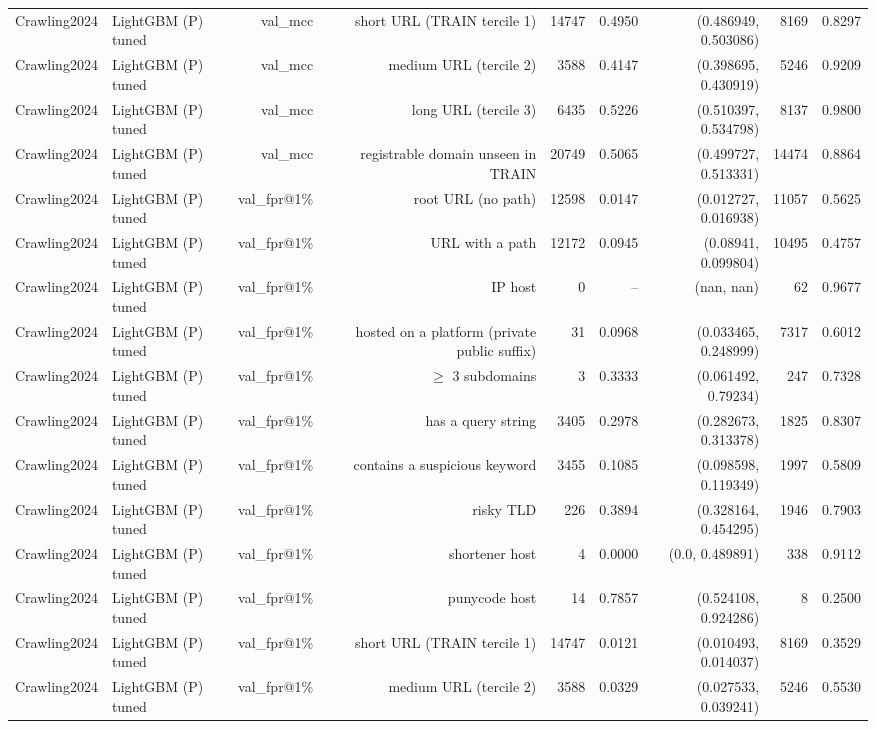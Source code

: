 \begin{table}[t]
\begin{tabular}{llrrrrrrr}
Crawling2024 & LightGBM (P) tuned & val\_mcc & short URL (TRAIN tercile 1) & 14747 & 0.4950 & (0.486949, 0.503086) & 8169 & 0.8297 \\
Crawling2024 & LightGBM (P) tuned & val\_mcc & medium URL (tercile 2) & 3588 & 0.4147 & (0.398695, 0.430919) & 5246 & 0.9209 \\
Crawling2024 & LightGBM (P) tuned & val\_mcc & long URL (tercile 3) & 6435 & 0.5226 & (0.510397, 0.534798) & 8137 & 0.9800 \\
Crawling2024 & LightGBM (P) tuned & val\_mcc & registrable domain unseen in TRAIN & 20749 & 0.5065 & (0.499727, 0.513331) & 14474 & 0.8864 \\
Crawling2024 & LightGBM (P) tuned & val\_fpr@1\% & root URL (no path) & 12598 & 0.0147 & (0.012727, 0.016938) & 11057 & 0.5625 \\
Crawling2024 & LightGBM (P) tuned & val\_fpr@1\% & URL with a path & 12172 & 0.0945 & (0.08941, 0.099804) & 10495 & 0.4757 \\
Crawling2024 & LightGBM (P) tuned & val\_fpr@1\% & IP host & 0 & -- & (nan, nan) & 62 & 0.9677 \\
Crawling2024 & LightGBM (P) tuned & val\_fpr@1\% & hosted on a platform (private public suffix) & 31 & 0.0968 & (0.033465, 0.248999) & 7317 & 0.6012 \\
Crawling2024 & LightGBM (P) tuned & val\_fpr@1\% & $\geq$ 3 subdomains & 3 & 0.3333 & (0.061492, 0.79234) & 247 & 0.7328 \\
Crawling2024 & LightGBM (P) tuned & val\_fpr@1\% & has a query string & 3405 & 0.2978 & (0.282673, 0.313378) & 1825 & 0.8307 \\
Crawling2024 & LightGBM (P) tuned & val\_fpr@1\% & contains a suspicious keyword & 3455 & 0.1085 & (0.098598, 0.119349) & 1997 & 0.5809 \\
Crawling2024 & LightGBM (P) tuned & val\_fpr@1\% & risky TLD & 226 & 0.3894 & (0.328164, 0.454295) & 1946 & 0.7903 \\
Crawling2024 & LightGBM (P) tuned & val\_fpr@1\% & shortener host & 4 & 0.0000 & (0.0, 0.489891) & 338 & 0.9112 \\
Crawling2024 & LightGBM (P) tuned & val\_fpr@1\% & punycode host & 14 & 0.7857 & (0.524108, 0.924286) & 8 & 0.2500 \\
Crawling2024 & LightGBM (P) tuned & val\_fpr@1\% & short URL (TRAIN tercile 1) & 14747 & 0.0121 & (0.010493, 0.014037) & 8169 & 0.3529 \\
Crawling2024 & LightGBM (P) tuned & val\_fpr@1\% & medium URL (tercile 2) & 3588 & 0.0329 & (0.027533, 0.039241) & 5246 & 0.5530 \\

\end{tabular}
\end{table}
